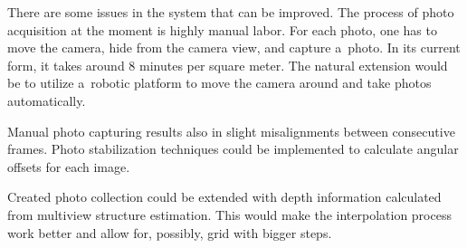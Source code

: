 \documentclass[conference]{ieeetran}
\begin{document}
There are some issues in the system that can be improved. The process of photo acquisition
at the moment is highly manual labor. For each photo, one has to move the camera, hide from
the camera view, and capture a~photo. In its current form, it takes around 8 minutes per square meter.
The natural extension would be to utilize a~robotic platform to move the camera around and
take photos automatically. 

Manual photo capturing results also in slight misalignments between consecutive frames.
Photo stabilization techniques could be implemented to calculate angular offsets for each
image.

Created photo collection could be extended with depth information calculated from multiview
structure estimation. This would make the interpolation process work better and allow for, 
possibly, grid with bigger steps.


 

\end{document}
